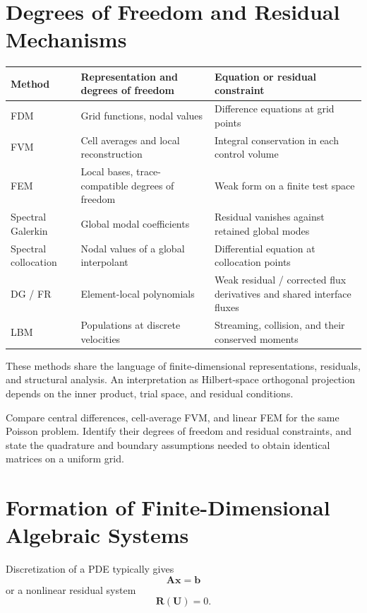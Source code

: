 \section{Degrees of Freedom and Residual Mechanisms}
\begin{center}\small
\begin{tabularx}{\textwidth}{@{}l>{\raggedright\arraybackslash}X>{\raggedright\arraybackslash}X@{}}
\toprule
Method & Representation and degrees of freedom & Equation or residual constraint\\
\midrule
FDM & Grid functions, nodal values & Difference equations at grid points\\
FVM & Cell averages and local reconstruction & Integral conservation in each control volume\\
FEM & Local bases, trace-compatible degrees of freedom & Weak form on a finite test space\\
Spectral Galerkin & Global modal coefficients & Residual vanishes against retained global modes\\
Spectral collocation & Nodal values of a global interpolant & Differential equation at collocation points\\
DG / FR & Element-local polynomials & Weak residual / corrected flux derivatives and shared interface fluxes\\
LBM & Populations at discrete velocities & Streaming, collision, and their conserved moments\\
\bottomrule
\end{tabularx}
\end{center}
These methods share the language of finite-dimensional representations, residuals, and structural analysis.
An interpretation as Hilbert-space orthogonal projection depends on the inner product, trial space, and residual conditions.

{Compare central differences, cell-average FVM, and linear FEM for the same Poisson problem. Identify their degrees of freedom and residual constraints, and state the quadrature and boundary assumptions needed to obtain identical matrices on a uniform grid.}

\section{Formation of Finite-Dimensional Algebraic Systems}
Discretization of a PDE typically gives
\[
\bm A\bm x=\bm b
\]
or a nonlinear residual system
\[
\bm R(\bm U)=0.
\]

